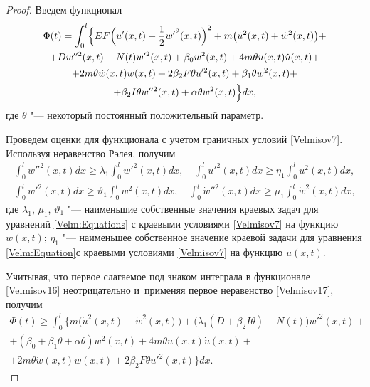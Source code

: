 \begin{proof}
Введем функционал
\begin{multline}
\label{Velmisov16}
\Phi (t)=\int_{0}^{l}
\Bigl\{ 
EF\Bigl(u'(x,t)+\frac{1}{2} {w'}^{2} (x,t)\Bigr)^{2} 
+m \bigl( \dot{u}^{2} (x,t)+\dot{w}^{2} (x,t) \bigr)+ 
\\ 
+
 Dw''^{2} (x,t) -N(t)w'^{2} (x,t)+\beta _{0} w^{2} (x,t)+4m\theta u(x,t)\dot{u}(x,t) + 
 \\ 
+2m\theta \dot{w}(x,t)w(x,t)+ 2\beta _{2} F\theta u'^{2} (x,t)+\beta _{1} \theta w^{2} (x,t) + 
\\ +\beta _{2}I \theta w''^{2} (x,t)+ \alpha \theta w^{2}(x,t)\Bigr\}dx,
\end{multline}
где $\theta$ "--- некоторый постоянный положительный параметр.

Проведем оценки для функционала с учетом граничных условий \eqref{Velmisov7}. Используя неравенство Рэлея, получим
\begin{equation} \label{Velmisov17} 
\begin{array}{c}
\displaystyle \int_{0}^{l} w''^{2} (x,t) dx\ge \lambda _{1} \int_{0}^{l} w'^{2} (x,t) dx,\quad  \int_{0}^{l}u'^{2} (x,t)dx\ge \eta _{1} \int_{0}^{l}u^{2} (x,t)dx,
\\[3mm]
\displaystyle \int_{0}^{l}w'^{2} (x,t)dx\ge \vartheta _{1} \int_{0}^{l}w^{2} (x,t)dx,\quad \int_{0}^{l} \dot{w}''^{2} (x,t) dx\ge \mu _{1} \int_{0}^{l} \dot{w}^{2} (x,t) dx,  
\end{array} 
\end{equation}  
где $\lambda _{1}$, $\mu _{1}$, $\vartheta_{1}$ "--- наименьшие собственные значения краевых задач для уравнений
\eqref{Velm:Equations} с краевыми условиями \eqref{Velmisov7} на функцию $w(x,t)$; 
$\eta _{1} $ "--- наименьшее собственное значение краевой задачи для уравнения \eqref{Velm:Equation}с краевыми условиями \eqref{Velmisov7} на функцию $u(x,t)$.

Учитывая, что первое слагаемое под знаком интеграла в функционале \eqref{Velmisov16} неотрицательно и~применяя первое неравенство \eqref{Velmisov17}, получим
\begin{multline}
\label{Velmisov18_1}
\Phi (t)\ge \int _{0}^{l}
\bigl\{ m \bigl(\dot{u}^{2} (x,t)+\dot{w}^{2} (x,t)\bigr)+
\bigl(\lambda_1(D+\beta _{2}I \theta) -N(t)\bigr)w'^{2} (x,t)+ 
\\
+\left(\beta _{0}+\beta _{1} \theta+ \alpha \theta\right) w^{2} (x,t)+4m\theta u(x,t)\dot{u}(x,t)+
\\ +2m\theta \dot{w}(x,t)w(x,t) +2\beta _{2}F \theta u'^{2} (x,t)\bigr\}dx.
\end{multline}




\end{proof}
